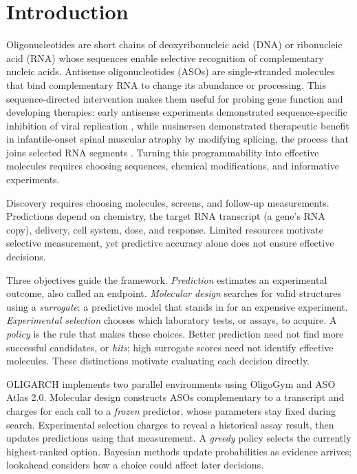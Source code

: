 \documentclass[letterpaper]{article}
\begin{document}
\section{Introduction}
Oligonucleotides are short chains of deoxyribonucleic acid (DNA) or ribonucleic acid (RNA) whose sequences enable selective recognition of complementary nucleic acids. Antisense oligonucleotides (ASOs) are single-stranded molecules that bind complementary RNA to change its abundance or processing. This sequence-directed intervention makes them useful for probing gene function and developing therapies: early antisense experiments demonstrated sequence-specific inhibition of viral replication \citep{zamecnik}, while nusinersen demonstrated therapeutic benefit in infantile-onset spinal muscular atrophy by modifying splicing, the process that joins selected RNA segments \citep{finkel}. Turning this programmability into effective molecules requires choosing sequences, chemical modifications, and informative experiments.

Discovery requires choosing molecules, screens, and follow-up measurements. Predictions depend on chemistry, the target RNA transcript (a gene's RNA copy), delivery, cell system, dose, and response. Limited resources motivate selective measurement, yet predictive accuracy alone does not ensure effective decisions.

Three objectives guide the framework. \emph{Prediction} estimates an experimental outcome, also called an endpoint. \emph{Molecular design} searches for valid structures using a \emph{surrogate}: a predictive model that stands in for an expensive experiment. \emph{Experimental selection} chooses which laboratory tests, or assays, to acquire. A \emph{policy} is the rule that makes these choices. Better prediction need not find more successful candidates, or \emph{hits}; high surrogate scores need not identify effective molecules. These distinctions motivate evaluating each decision directly.

OLIGARCH implements two parallel environments using OligoGym and ASO Atlas 2.0. Molecular design constructs ASOs complementary to a transcript and charges for each call to a \emph{frozen} predictor, whose parameters stay fixed during search. Experimental selection charges to reveal a historical assay result, then updates predictions using that measurement. A \emph{greedy} policy selects the currently highest-ranked option. Bayesian methods update probabilities as evidence arrives; lookahead considers how a choice could affect later decisions.
\end{document}
